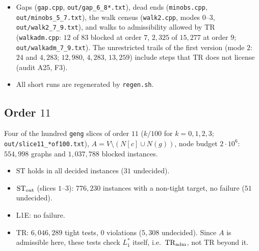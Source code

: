 \documentclass[11pt]{amsart}
\theoremstyle{definition}
\newcommand{\TR}{\mathrm{TR}}
\newcommand{\ST}{\mathrm{ST}}
\begin{document}
\begin{itemize}
\item Gaps (\texttt{gap.cpp}, \texttt{out/gap\_6\_8*.txt}), dead ends (\texttt{minobs.cpp},
\texttt{out/minobs\_5\_7.txt}), the walk census (\texttt{walk2.cpp}, modes $0$--$3$,
\texttt{out/walk2\_7\_9.txt}), and walks to admissibility allowed by $\TR$ (\texttt{walkadm.cpp}: $12$
of $83$ blocked at order $7$, $2{,}325$ of $15{,}277$ at order $9$; \texttt{out/walkadm\_7\_9.txt}).
The unrestricted trails of the first version (mode $2$: $24$ and $4{,}283$; $12{,}980$, $4{,}283$,
$13{,}259$) include steps that $\TR$ does not license (audit A25, F3).
\item All short runs are regenerated by \texttt{regen.sh}.
\end{itemize}

\subsection*{Order $11$}
Four of the hundred \texttt{geng} slices of order $11$ ($k/100$ for $k=0,1,2,3$;
\texttt{out/slice11\_*of100.txt}), $A=V\setminus(N[c]\cup N(g))$, node budget $2\cdot10^6$: $554{,}998$
graphs and $1{,}037{,}788$ blocked instances.
\begin{itemize}
\item $\ST$ holds in all decided instances ($31$ undecided).
\item $\ST_{\rm out}$ (slices $1$--$3$): $776{,}230$ instances with a non-tight target, no failure ($51$
undecided).
\item L1E: no failure.
\item $\TR$: $6{,}046{,}289$ tight tests, $0$ violations ($5{,}308$ undecided). Since $A$ is admissible
here, these tests check $L_1^*$ itself, i.e.\ $\TR_{\rm adm}$, not $\TR$ beyond it.
\end{itemize}
\end{document}
